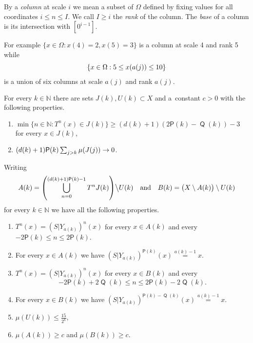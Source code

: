 \documentclass[AHL,Unicode,longabstracts,published]{cedram}
\DeclareMathOperator{\Q}{\mathsf{Q}}
\newcommand{\N}{\mathbb{N}}
\renewcommand{\P}{\mathsf{P}}
\let\originalleft\left
\let\originalright\right
\renewcommand{\left}{\mathopen{}\mathclose\bgroup\originalleft}
\renewcommand{\right}{\aftergroup\egroup\originalright}
\renewcommand*{\to}{\mathchoice{\longrightarrow}{\rightarrow}{\rightarrow}{\rightarrow}}
\newcommand*{\relabel}{\renewcommand{\labelenumi}{(\theenumi)}}
\newcommand*{\PJenumi}{\renewcommand*{\theenumi}{PJ\arabic{enumi}}\relabel}
\begin{document}
\begin{defi}
By a
\emph{column} at scale $i$ we mean a subset of $\Omega$ defined by fixing values for all coordinates $i \le n \le I$. We call $I \ge i$ the
\emph{rank} of the column. The
\emph{base} of a column is its intersection with $[0^{i-1}]$.
\end{defi}


For example $\{ x \in \Omega : x(4) = 2, x(5) = 3 \}$ is a column at scale 4 and rank 5 while
\[
\left\{ x \in \Omega : 5 \le x(a(j)) \le 10 \right\}
\]
is a union of six columns at scale $a(j)$ and rank $a(j)$.

\begin{prop}\label{prop:joining_prep}
For every $k \in \N$ there are sets $J(k), U(k) \subset X$ and a~constant $c>0$ with the following properties.
\begin{enumerate}\PJenumi
\item\label{jt:return}
$\min \{ n \in \N : T^n(x) \in J(k) \} \ge (d(k)+1)(2\P(k) - \Q(k))-3$ for every $x \in J(k)$,
\item\label{jt:shrinking}
$(d(k)+1) \P(k) \sum_{j > k} \mu(J(j)) \to 0$.
\end{enumerate}
Writing
\[
A(k) = \left(\bigcup_{n=0}^{(d(k)+1)\P(k)-1} T^n J(k)\right)
\big\backslash U(k)
\quad \text{and} \quad B(k) = \bigl(X \setminus A(k)\bigr) \setminus U(k)
\]
for every $k \in \N$ we have all the following properties.
\begin{enumerate}\PJenumi
\setcounter{enumi}{2}
\item\label{jt:left}
$T^n(x) = (S|Y_{a(k)})^n(x)$ for every $x \in A(k)$ and every $-2 \P(k) \le n \le 2 \P(k).$
\item \label{conc:same left}
For every $x \in A(k)$ we have $(S|Y_{a(k)})^{\P(k)}(x) \overset{a(k)-1}{=}x$.
\item\label{jt:right}
$T^n(x) = (S|Y_{a(k)})^n(x)$ for every $x \in B(k)$ and every
\[
-2\P(k) + 2\Q(k) \le n \le 2\P(k) - 2\Q(k).
\]
\item \label{conc:same right}
For every $x \in B(k)$ we have $(S|Y_{a(k)})^{\P(k)-\Q(k)}(x) \overset{a(k)-1}{=}x$.
\item\label{jt:discard}
$\mu(U(k)) \le \frac {15} {2^k}$,
\item\label{jt:proportion}
$\mu(A(k)) \ge c$ and $\mu(B(k)) \ge c$.
\end{enumerate}
\end{prop}
\end{document}

